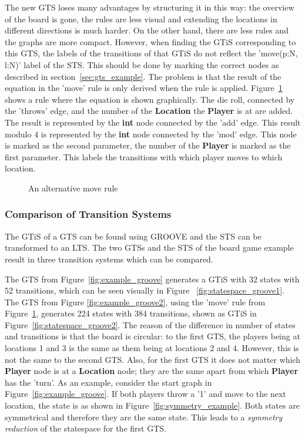 The new GTS loses many advantages by structuring it in this way: the overview of the board is gone, the rules are less visual and extending the locations in different directions is much harder. On the other hand, there are less rules and the graphs are more compact. However, when finding the GTiS corresponding to this GTS, the labels of the transitions of that GTiS do not reflect the 'move(p:N, l:N)' label of the STS. This should be done by marking the correct nodes as described in section~\ref{sec:gts_example}. The problem is that the result of the equation in the 'move' rule is only derived when the rule is applied. Figure~\ref{fig:move3} shows a rule where the equation is shown graphically. The die roll, connected by the 'throws' edge, and the number of the \textbf{Location} the \textbf{Player} is at are added. The result is represented by the \textbf{int} node connected by the 'add' edge. This result modulo 4 is represented by the \textbf{int} node connected by the 'mod' edge. This node is marked as the second parameter, the number of the \textbf{Player} is marked as the first parameter. This labels the transitions with which player moves to which location.

\begin{figure}[h]
  \begin{center}
    
  \end{center}
  \caption{An alternative move rule}
  \label{fig:move3}
\end{figure}

\subsubsection{Comparison of Transition Systems}
The GTiS of a GTS can be found using GROOVE and the STS can be transformed to an LTS. The two GTSs and the STS of the board game example result in three transition systems which can be compared.

The GTS from Figure~\ref{fig:example_groove} generates a GTiS with 32 states with 52 transitions, which can be seen visually in Figure~ \ref{fig:statespace_groove1}. The GTS from Figure \ref{fig:example_groove2}, using the 'move' rule from Figure~\ref{fig:move3}, generates 224 states with 384 transitions, shown as GTiS in Figure~\ref{fig:statespace_groove2}. The reason of the difference in number of states and transitions is that the board is circular: to the first GTS, the players being at locations 1 and 3 is the same as them being at locations 2 and 4. However, this is not the same to the second GTS. Also, for the first GTS it does not matter which \textbf{Player} node is at a \textbf{Location} node; they are the same apart from which \textbf{Player} has the 'turn'. As an example, consider the start graph in Figure~\ref{fig:example_groove}. If both players throw a '1' and move to the next location, the state is as shown in Figure~\ref{fig:symmetry_example}. Both states are symmetrical and therefore they are the same state. This leads to a \textit{symmetry reduction} of the statespace for the first GTS.

